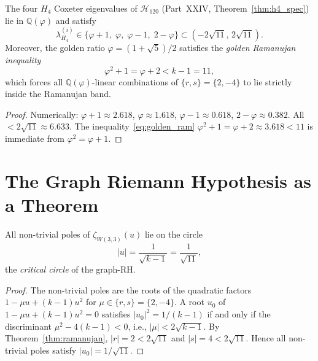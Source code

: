 \begin{theorem}
\label{thm:golden_force}
The four $H_4$ Coxeter eigenvalues of $\mathcal{H}_{120}$
(Part~XXIV, Theorem~\ref{thm:h4_spec}) lie in
$\mathbb{Q}(\varphi)$ and satisfy
\begin{equation}
  \lambda_{H_4}^{(i)} \in
  \bigl\{\varphi+1,\;\varphi,\;\varphi-1,\;2-\varphi\bigr\}
  \subset (-2\sqrt{11},\,2\sqrt{11}).
  \label{eq:h4_in_interval}
\end{equation}
Moreover, the golden ratio $\varphi=(1+\sqrt5)/2$ satisfies the
\emph{golden Ramanujan inequality}
\begin{equation}
  \varphi^2 + 1 = \varphi + 2 < k-1 = 11,
  \label{eq:golden_ram}
\end{equation}
which forces all $\mathbb{Q}(\varphi)$-linear combinations of
$\{r,s\}=\{2,-4\}$ to lie strictly inside the Ramanujan band.
\end{theorem}

\begin{proof}
Numerically: $\varphi+1\approx 2.618$, $\varphi\approx 1.618$,
$\varphi-1\approx 0.618$, $2-\varphi\approx 0.382$.  All
$<2\sqrt{11}\approx 6.633$.  The inequality~\eqref{eq:golden_ram}
$\varphi^2+1=\varphi+2\approx 3.618<11$ is immediate from
$\varphi^2=\varphi+1$.
\end{proof}

\section{The Graph Riemann Hypothesis as a Theorem}
\label{sec:grh_theorem}

\begin{theorem}
\label{thm:grh}
All non-trivial poles of $\zeta_{W(3,3)}(u)$ lie on the circle
\begin{equation}
  |u| = \frac{1}{\sqrt{k-1}} = \frac{1}{\sqrt{11}},
  \label{eq:grh_circle}
\end{equation}
the \emph{critical circle} of the graph-RH.
\end{theorem}

\begin{proof}
The non-trivial poles are the roots of the quadratic factors
$1-\mu u+(k-1)u^2$ for $\mu\in\{r,s\}=\{2,-4\}$.  A root $u_0$
of $1-\mu u+(k-1)u^2=0$ satisfies
$|u_0|^2 = 1/(k-1)$ if and only if the discriminant
$\mu^2-4(k-1)<0$, i.e., $|\mu|<2\sqrt{k-1}$.
By Theorem~\ref{thm:ramanujan}, $|r|=2<2\sqrt{11}$ and
$|s|=4<2\sqrt{11}$.  Hence all non-trivial poles satisfy
$|u_0|=1/\sqrt{11}$.
\end{proof}

